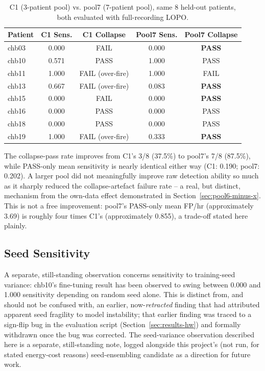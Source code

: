 \begin{table}[H]
\centering
\caption{C1 (3-patient pool) vs. pool7 (7-patient pool), same 8 held-out patients, both evaluated with full-recording LOPO.}
\label{tab:c1-vs-pool7}
\begin{tabular}{lcccc}
\toprule
Patient & C1 Sens. & C1 Collapse & Pool7 Sens. & Pool7 Collapse \\
\midrule
chb03 & 0.000 & FAIL & 0.000 & \textbf{PASS} \\
chb10 & 0.571 & PASS & 1.000 & PASS \\
chb11 & 1.000 & FAIL (over-fire) & 1.000 & FAIL \\
chb13 & 0.667 & FAIL (over-fire) & 0.083 & \textbf{PASS} \\
chb15 & 0.000 & FAIL & 0.000 & \textbf{PASS} \\
chb16 & 0.000 & PASS & 0.000 & PASS \\
chb18 & 0.000 & PASS & 0.000 & PASS \\
chb19 & 1.000 & FAIL (over-fire) & 0.333 & \textbf{PASS} \\
\bottomrule
\end{tabular}
\end{table}

The collapse-pass rate improves from C1's 3/8 (37.5\%) to pool7's 7/8 (87.5\%), while PASS-only mean sensitivity is nearly identical either way (C1: 0.190; pool7: 0.202). A larger pool did not meaningfully improve raw detection ability so much as it sharply reduced the collapse-artefact failure rate -- a real, but distinct, mechanism from the own-data effect demonstrated in Section~\ref{sec:pool6-minus-x}. This is not a free improvement: pool7's PASS-only mean FP/hr (approximately 3.69) is roughly four times C1's (approximately 0.855), a trade-off stated here plainly.

\subsection{Seed Sensitivity}

A separate, still-standing observation concerns sensitivity to training-seed variance: chb10's fine-tuning result has been observed to swing between 0.000 and 1.000 sensitivity depending on random seed alone. This is distinct from, and should not be confused with, an earlier, now-\emph{retracted} finding that had attributed apparent seed fragility to model instability; that earlier finding was traced to a sign-flip bug in the evaluation script (Section~\ref{sec:results-hw}) and formally withdrawn once the bug was corrected. The seed-variance observation described here is a separate, still-standing note, logged alongside this project's (not run, for stated energy-cost reasons) seed-ensembling candidate as a direction for future work.

